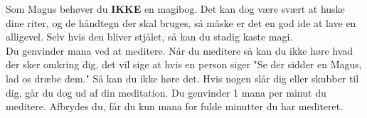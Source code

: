 Som Magus behøver du \textbf{IKKE} en magibog. Det kan dog være svært at huske dine riter, og de håndtegn der skal bruges, så måske er det en god ide at lave en alligevel. Selv hvis den bliver stjålet, så kan du stadig kaste magi.\\

Du genvinder mana ved at meditere. Når du meditere så kan du ikke høre hvad der sker omkring dig, det vil sige at hvis en person siger "Se der sidder en Magus, lad os dræbe dem." Så kan du ikke høre det. Hvis nogen slår dig eller skubber til dig, går du dog ud af din meditation. Du genvinder 1 mana per minut du meditere. Afbrydes du, får du kun mana for fulde minutter du har mediteret.\\